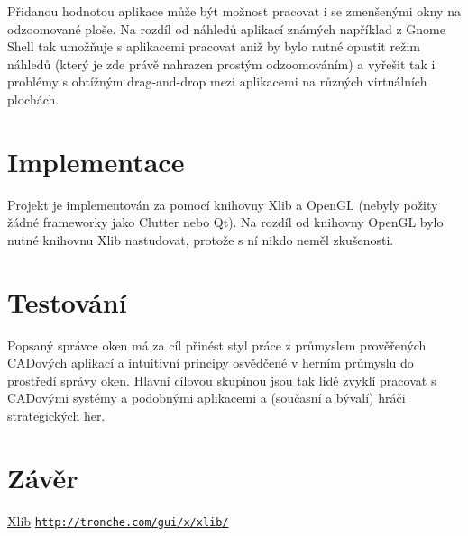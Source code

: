 \documentclass[12pt,a4paper,titlepage,final]{article}
\begin{document}
Přidanou hodnotou aplikace může být možnost pracovat i se zmenšenými okny na odzoomované ploše.
Na rozdíl od náhledů aplikací známých například z Gnome Shell tak umožňuje s aplikacemi pracovat aniž by bylo nutné opustit režim náhledů (který je zde právě nahrazen prostým odzoomováním) a vyřešit tak i problémy s obtížným drag-and-drop mezi aplikacemi na různých virtuálních plochách.

\section{Implementace}

Projekt je implementován za pomocí knihovny Xlib a OpenGL (nebyly požity žádné frameworky jako Clutter nebo Qt).
Na rozdíl od knihovny OpenGL bylo nutné knihovnu Xlib nastudovat, protože s ní nikdo neměl zkušenosti.


\section{Testování}

Popsaný správce oken má za cíl přinést styl práce z průmyslem prověřených CADových aplikací a intuitivní principy osvědčené v herním průmyslu do prostředí správy oken.
Hlavní cílovou skupinou jsou tak lidé zvyklí pracovat s CADovými systémy a podobnými aplikacemi a (současní a bývalí) hráči strategických her.

\section{Závěr} \label{zaver}

\begin{thebibliography}{1}

\href{http://tronche.com/gui/x/xlib/}{Xlib} \newline
\href{http://tronche.com/gui/x/xlib/}{\nolinkurl{http://tronche.com/gui/x/xlib/}}

\end{thebibliography}

\end{document}
